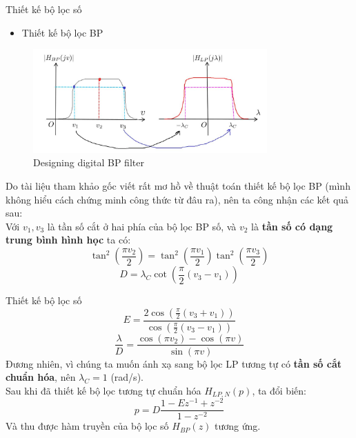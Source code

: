 \documentclass[8pt]{beamer}
\begin{document}
\begin{frame}{Thiết kế bộ lọc số}
\begin{itemize}
	\item Thiết kế bộ lọc BP
\end{itemize}
\begin{figure}[h]
	\includegraphics[width=0.8\textwidth]{27.jpg}
	\caption{Designing digital BP filter}			\label{fig:re2}
		\end{figure}
Do tài liệu tham khảo gốc viết rất mơ hồ về thuật toán thiết kế bộ lọc BP (mình không hiểu cách chứng minh công thức từ đâu ra), nên ta công nhận các kết quả sau:
\\ Với $v_{1},v_{3}$ là tần số cắt ở hai phía của bộ lọc BP số, và $v_{2}$ là \textbf{tần số có dạng trung bình hình học} ta có:
$$\tan^2{\left(\frac{\pi v_{2}}{2}\right)}=\tan^2{\left(\frac{\pi v_{1}}{2}\right)}\tan^2{\left(\frac{\pi v_{3}}{2}\right)}$$
$$D=\lambda_{C}\cot{\left(\frac{\pi}{2}(v_{3}-v_{1})\right)}$$

\end{frame}
\begin{frame}{Thiết kế bộ lọc số}
	$$E=\frac{2\cos{\left(\frac{\pi}{2}(v_{3}+v_{1})\right)}}{\cos{\left(\frac{\pi}{2}(v_{3}-v_{1})\right)}}$$
	$$\frac{\lambda}{D}=\frac{\cos(\pi v_{2})-\cos(\pi v)}{\sin(\pi v)}$$
	Đương nhiên, vì chúng ta muốn ánh xạ sang bộ lọc LP tương tự có \textbf{tần số cắt chuẩn hóa}, nên $\lambda_{C}=1$ (rad/s).
\\	Sau khi đã thiết kế bộ lọc tương tự chuẩn hóa $H_{LP,N}(p)$, ta đổi biến:
	$$p=D\frac{1-Ez^{-1}+z^{-2}}{1-z^{-2}}$$
Và thu được hàm truyền của bộ lọc số $H_{BP}(z)$ tương ứng.
	\end{frame}
\end{document}
